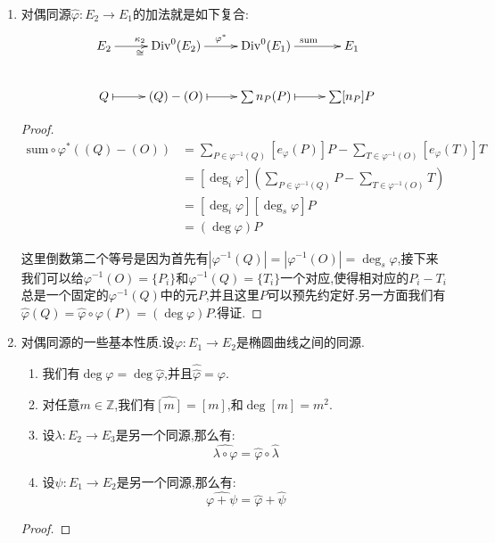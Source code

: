 \begin{enumerate}
\begin{proof}
		再设$\varphi$是素数$p$次的Frobenius态射.此时$\mathrm{char}(K)=p$,我们有$[p]^*\omega=p\omega=0$,于是$[p]$不是$E$上的可分的态射.于是我们有同源分解$[p]=\psi\circ\varphi^e,e\ge1$,其中$\psi$是可分的态射.于是我们取$\widehat{\varphi}=\psi\circ\varphi^{e-1}$就满足$\widehat{\varphi}\circ\varphi=[p]$,得到存在性.
	\end{proof}
	\item 对偶同源$\widehat{\varphi}:E_2\to E_1$的加法就是如下复合:
	$$\xymatrix{E_2\ar[r]^{\kappa_2}_{\cong}&\mathrm{Div}^0(E_2)\ar[r]^{\varphi^*}&\mathrm{Div}^0(E_1)\ar[r]^{\mathrm{sum}}&E_1\\Q\ar@{|->}[r]&(Q)-(O)\ar@{|->}[r]&\sum n_P(P)\ar@{|->}[r]&\sum[n_P]P}$$
	\begin{proof}
		\begin{align*}
			\mathrm{sum}\circ\varphi^*((Q)-(O))&=\sum_{P\in\varphi^{-1}(Q)}[e_{\varphi}(P)]P-\sum_{T\in\varphi^{-1}(O)}[e_{\varphi}(T)]T\\&=[\deg_i\varphi]\left(\sum_{P\in\varphi^{-1}(Q)}P-\sum_{T\in\varphi^{-1}(O)}T\right)\\&=[\deg_i\varphi][\deg_s\varphi]P\\&=(\deg\varphi)P
		\end{align*}
		
		这里倒数第二个等号是因为首先有$|\varphi^{-1}(Q)|=|\varphi^{-1}(O)|=\deg_s\varphi$,接下来我们可以给$\varphi^{-1}(O)=\{P_i\}$和$\varphi^{-1}(Q)=\{T_i\}$一个对应,使得相对应的$P_i-T_i$总是一个固定的$\varphi^{-1}(Q)$中的元$P$,并且这里$P$可以预先约定好.另一方面我们有$\widehat{\varphi}(Q)=\widehat{\varphi}\circ\varphi(P)=(\deg\varphi)P$.得证.
	\end{proof}
	\item 对偶同源的一些基本性质.设$\varphi:E_1\to E_2$是椭圆曲线之间的同源.
	\begin{enumerate}
		\item 我们有$\deg\varphi=\deg\widehat{\varphi}$,并且$\widehat{\widehat{\varphi}}=\varphi$.
		\item 对任意$m\in\mathbb{Z}$,我们有$\widehat{[m]}=[m]$,和$\deg[m]=m^2$.
		\item 设$\lambda:E_2\to E_3$是另一个同源,那么有:
		$$\widehat{\lambda\circ\varphi}=\widehat{\varphi}\circ\widehat{\lambda}$$
		\item 设$\psi:E_1\to E_2$是另一个同源,那么有:
		$$\widehat{\varphi+\psi}=\widehat{\varphi}+\widehat{\psi}$$
	\end{enumerate}
	\begin{proof}
		

\end{proof}
\end{enumerate}
